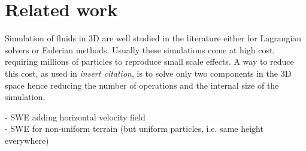 \section{Related work}

Simulation of fluids in 3D are well studied in the literature either for Lagrangian solvers or Eulerian methods. Usually these simulations come at high cost, requiring millions of particles to reproduce small scale effects. 
A way to reduce this cost, as used in \textit{insert citation}, is to solve only two components in the 3D space hence reducing the number of operations and the internal size of the simulation. 

- SWE adding horizontal velocity field \cite{Solenthaler2011SPHBS}\\

- SWE for non-uniform terrain \cite{RodrguezPaz2005ACS} (but uniform particles, i.e. same height everywhere)